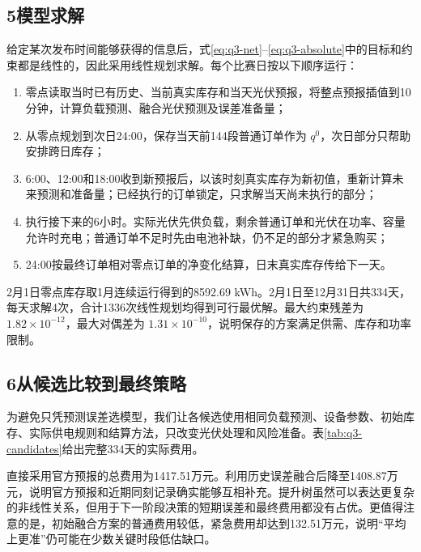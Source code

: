 \subsection*{5\quad 模型求解}

给定某次发布时间能够获得的信息后，式\eqref{eq:q3-net}--\eqref{eq:q3-absolute}中的目标和约束都是线性的，因此采用线性规划求解。每个比赛日按以下顺序运行：
\begin{enumerate}
\item 零点读取当时已有历史、当前真实库存和当天光伏预报，将整点预报插值到10分钟，计算负载预测、融合光伏预测及误差准备量；
\item 从零点规划到次日24:00，保存当天前144段普通订单作为 $q^0$，次日部分只帮助安排跨日库存；
\item 6:00、12:00和18:00收到新预报后，以该时刻真实库存为新初值，重新计算未来预测和准备量；已经执行的订单锁定，只求解当天尚未执行的部分；
\item 执行接下来的6小时。实际光伏先供负载，剩余普通订单和光伏在功率、容量允许时充电；普通订单不足时先由电池补缺，仍不足的部分才紧急购买；
\item 24:00按最终订单相对零点订单的净变化结算，日末真实库存传给下一天。
\end{enumerate}

2月1日零点库存取1月连续运行得到的8592.69 kWh。2月1日至12月31日共334天，每天求解4次，合计1336次线性规划均得到可行最优解。最大约束残差为 $1.82\times10^{-12}$，最大对偶差为 $1.31\times10^{-10}$，说明保存的方案满足供需、库存和功率限制。

\subsection*{6\quad 从候选比较到最终策略}

为避免只凭预测误差选模型，我们让各候选使用相同负载预测、设备参数、初始库存、实际供电规则和结算方法，只改变光伏处理和风险准备。表\ref{tab:q3-candidates}给出完整334天的实际费用。
\begin{inlinetable}
\caption{问题三候选方案的334天费用比较}\label{tab:q3-candidates}
\end{inlinetable}

直接采用官方预报的总费用为1417.51万元。利用历史误差融合后降至1408.87万元，说明官方预报和近期同刻记录确实能够互相补充。提升树虽然可以表达更复杂的非线性关系，但用于下一阶段决策的短期误差和最终费用都没有占优。更值得注意的是，初始融合方案的普通费用较低，紧急费用却达到132.51万元，说明“平均上更准”仍可能在少数关键时段低估缺口。


